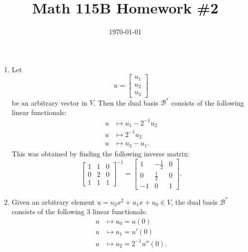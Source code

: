 \documentclass{article}
\date{\today}
\title{Math 115B Homework \#2}
\begin{document}
\maketitle

\begin{prob}
\end{prob}
\begin{enumerate}[label=(\alph*)]
    \item Let
        \[ u = \begin{bmatrix}
            u_1 \\
            u_2 \\
            u_3
        \end{bmatrix} \]
        be an arbitrary vector in $V$. Then the dual basis $\mathcal{B}^*$ consists of the following linear functionals:
        \begin{align*}
            u &\mapsto u_1 - 2^{-1} u_2 \\
            u &\mapsto 2^{-1} u_2 \\
            u &\mapsto u_3 - u_1.
        \end{align*}
        This was obtained by finding the following inverse matrix:
        \[ \begin{bmatrix}
            1 & 1 & 0 \\
            0 & 2 & 0 \\
            1 & 1 & 1
        \end{bmatrix}^{-1} = \begin{bmatrix}
            1 & - \frac{1}{2} & 0 \\
            0 & \frac{1}{2} & 0 \\
            -1 & 0 & 1
        \end{bmatrix}. \]
    \item Given an arbitrary element $u = u_2 x^2 + u_1 x + u_0 \in V$, the dual basis $\mathcal{B}^*$ consists of the following 3 linear functionals: \begin{align*}
            u &\mapsto u_0 = u(0) \\
            u &\mapsto u_1 = u'(0) \\
            u &\mapsto u_2 = 2^{-1} u''(0).
    \end{align*}
\end{enumerate}
\end{document}
